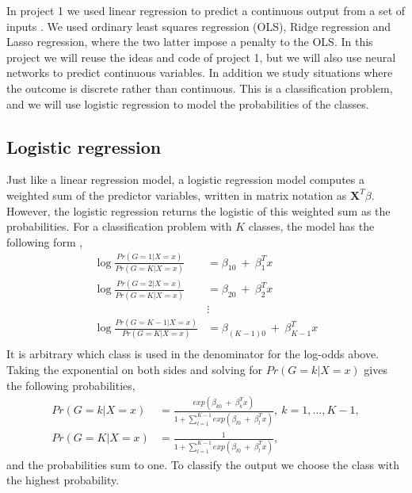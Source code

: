 In project 1 we used linear regression to predict a continuous output from a set of inputs \cite{project1-eirik-joakim,project1-vege}. We used ordinary least squares regression (OLS), Ridge regression and Lasso regression, where the two latter impose a penalty to the OLS. In this project we will reuse the ideas and code of project 1, but we will also use neural networks to predict continuous variables. In addition we study situations where the outcome is discrete rather than continuous. This is a classification problem, and we will use logistic regression to model the probabilities of the classes.

\subsection{Logistic regression}
Just like a linear regression model, a logistic regression model computes a weighted sum of the predictor variables, written in matrix notation as $\bm{X}^T\beta$. However, the logistic regression returns the logistic of this weighted sum as the probabilities. For a classification problem with $K$ classes, the model has the following form \citep[p.119]{james2013introduction},
\begin{equation}\label{eqT:logreg_def}
\begin{split}
\log\frac{Pr(G=1|X=x)}{Pr(G=K|X=x)} &= \beta_{10}\ +\ \beta_{1}^Tx\\
\log\frac{Pr(G=2|X=x)}{Pr(G=K|X=x)} &= \beta_{20}\ +\ \beta_{2}^Tx\\
&\vdots\\
\log\frac{Pr(G=K-1|X=x)}{Pr(G=K|X=x)} &= \beta_{(K-1)0}\ +\ \beta_{K-1}^Tx\\
\end{split}
\end{equation}
It is arbitrary which class is used in the denominator for the log-odds above. Taking the exponential on both sides and solving for $Pr(G=k|X=x)$ gives the following probabilities,
\begin{equation}\label{eqT:logreg_prob}
\begin{split}
Pr(G=k|X=x) &= \frac{exp(\beta_{k0}\ +\ \beta_{k}^Tx)}{1+\sum_{l=1}^{K-1}exp(\beta_{l0}\ +\ \beta_{l}^Tx)},\ k=1,\dots,K-1,\\
Pr(G=K|X=x) &= \frac{1}{1+\sum_{l=1}^{K-1}exp(\beta_{l0}\ +\ \beta_{l}^Tx)},
\end{split}
\end{equation}
and the probabilities sum to one. To classify the output we choose the class with the highest probability.

